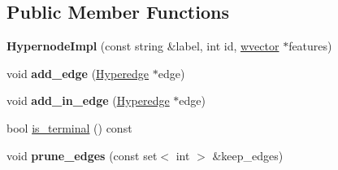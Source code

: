 \subsection*{Public Member Functions}
\begin{DoxyCompactItemize}
\item 
\hypertarget{classScarab_1_1HG_1_1HypernodeImpl_a574c6f1386fb27894075977ef1ca56d6}{
{\bfseries HypernodeImpl} (const string \&label, int id, \hyperlink{classsvector}{wvector} $\ast$features)}
\label{classScarab_1_1HG_1_1HypernodeImpl_a574c6f1386fb27894075977ef1ca56d6}

\item 
\hypertarget{classScarab_1_1HG_1_1HypernodeImpl_a0899a4e97f535c2f005d7c5ab5364681}{
void {\bfseries add\_\-edge} (\hyperlink{classScarab_1_1HG_1_1Hyperedge}{Hyperedge} $\ast$edge)}
\label{classScarab_1_1HG_1_1HypernodeImpl_a0899a4e97f535c2f005d7c5ab5364681}

\item 
\hypertarget{classScarab_1_1HG_1_1HypernodeImpl_ab05500702d5fa1c896efe941f9c54bf3}{
void {\bfseries add\_\-in\_\-edge} (\hyperlink{classScarab_1_1HG_1_1Hyperedge}{Hyperedge} $\ast$edge)}
\label{classScarab_1_1HG_1_1HypernodeImpl_ab05500702d5fa1c896efe941f9c54bf3}

\item 
bool \hyperlink{classScarab_1_1HG_1_1HypernodeImpl_a2bb4b33ff207c3c1babe135b9af6323e}{is\_\-terminal} () const 
\item 
\hypertarget{classScarab_1_1HG_1_1HypernodeImpl_a6675d677bd7e794ae9a8bf72645b828a}{
void {\bfseries prune\_\-edges} (const set$<$ int $>$ \&keep\_\-edges)}
\label{classScarab_1_1HG_1_1HypernodeImpl_a6675d677bd7e794ae9a8bf72645b828a}


\end{DoxyCompactItemize}
